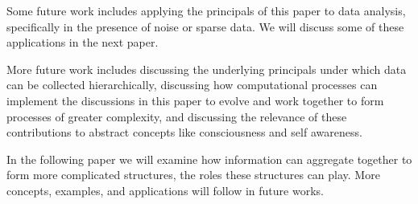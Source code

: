 \documentclass[english]{article}
\begin{document}
Some future work includes applying the principals of this paper to
data analysis, specifically in the presence of noise or sparse data.
We will discuss some of these applications in the next paper.

More future work includes discussing the underlying principals under
which data can be collected hierarchically, discussing how computational
processes can implement the discussions in this paper to evolve and
work together to form processes of greater complexity, and discussing
the relevance of these contributions to abstract concepts like consciousness
and self awareness.

In the following paper we will examine how information can aggregate
together to form more complicated structures, the roles these structures
can play. More concepts, examples, and applications will follow in
future works.
\end{document}
